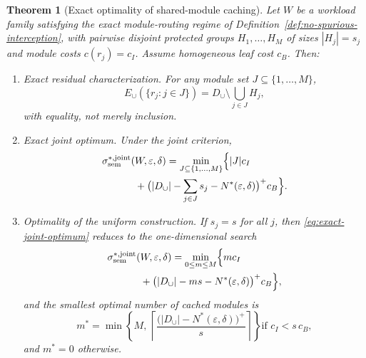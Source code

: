 \documentclass[journal]{IEEEtran}
\newtheorem{theorem}{Theorem}[section]
\numberwithin{equation}{section}
\begin{document}
\begin{theorem}[Exact optimality of shared-module caching]
\label{thm:shared-module-exact-optimality}
Let \(W\) be a workload family satisfying the exact module-routing regime of
Definition~\ref{def:no-spurious-interception}, with pairwise disjoint
protected groups \(H_1,\ldots,H_M\) of sizes \(|H_j|=s_j\) and module costs
\(c(r_j)=c_I\).  Assume homogeneous leaf cost \(c_B\).  Then:

\begin{enumerate}[label=\textup{(\Roman*)}]
\item \emph{Exact residual characterization.}  For any module set
\(J\subseteq\{1,\ldots,M\}\),
\begin{equation}
  E_{\cup}(\{r_j:j\in J\})
  =
  D_{\cup}\setminus\bigcup_{j\in J}H_j,
\label{eq:exact-residual-union}
\end{equation}
with equality, not merely inclusion.

\item \emph{Exact joint optimum.}  Under the joint criterion,
\begin{equation}
  \begin{aligned}
    \sigma_{\mathrm{sem}}^{*,\mathrm{joint}}( & W,\varepsilon,\delta)
    =
    \min_{J\subseteq\{1,\ldots,M\}}
    \Bigl\{ |J|c_I \\
    & + \bigl( |D_{\cup}|-\sum_{j\in J}s_j-N^*(\varepsilon,\delta) \bigr)^+ c_B \Bigr\}.
  \end{aligned}
\label{eq:exact-joint-optimum}
\end{equation}

\item \emph{Optimality of the uniform construction.}  If \(s_j=s\) for all
\(j\), then \eqref{eq:exact-joint-optimum} reduces to the one-dimensional
search
\begin{equation}
  \begin{aligned}
    \sigma_{\mathrm{sem}}^{*,\mathrm{joint}}( & W,\varepsilon,\delta)
    =
    \min_{0\le m\le M}
    \Bigl\{ m c_I \\
    & + \bigl( |D_{\cup}| - m s - N^*(\varepsilon,\delta) \bigr)^+ c_B \Bigr\},
  \end{aligned}
\label{eq:exact-joint-optimum-uniform}
\end{equation}
and the smallest optimal number of cached modules is
\begin{equation}
  m^*
  =
  \min\left\{
    M,\,
    \left\lceil
      \frac{\bigl(|D_{\cup}|-N^*(\varepsilon,\delta)\bigr)^+}
           {s}
    \right\rceil
  \right\}
  \text{if }c_I<s\,c_B,
\label{eq:optimal-module-count}
\end{equation}
and \(m^*=0\) otherwise.
\end{enumerate}
\end{theorem}
\end{document}
